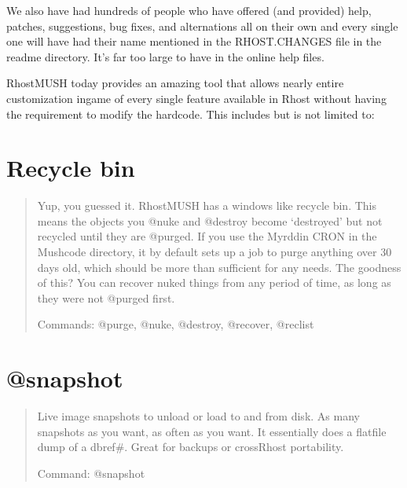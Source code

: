 \documentclass[letterpaper,10pt,english]{sphinxmanual}
\begin{document}
\sphinxAtStartPar
We also have had hundreds of people who have offered (and provided) help,
patches, suggestions, bug fixes, and alternations all on their own and
every single one will have had their name mentioned in the RHOST.CHANGES
file in the readme directory.  It’s far too large to have in the online
help files.

\sphinxAtStartPar
RhostMUSH today provides an amazing tool that allows nearly entire
customization in\sphinxhyphen{}game of every single feature available in Rhost without
having the requirement to modify the hardcode.  This includes but is
not limited to:


\section{Recycle bin}
\label{\detokenize{features:recycle-bin}}\begin{quote}

\sphinxAtStartPar
Yup, you guessed it.  RhostMUSH has a windows like recycle bin.
This means the objects you @nuke and @destroy become ‘destroyed’
but not recycled until they are @purged.  If you use the Myrddin
CRON in the Mushcode directory, it by default sets up a job
to purge anything over 30 days old, which should be more than
sufficient for any needs.  The goodness of this?  You can recover
nuked things from any period of time, as long as they were not
@purged first.

\sphinxAtStartPar
Commands: @purge, @nuke, @destroy, @recover, @reclist
\end{quote}


\section{@snapshot}
\label{\detokenize{features:snapshot}}\begin{quote}

\sphinxAtStartPar
Live image snapshots to unload or load to and from
disk.  As many snapshots as you want, as often as you want.
It essentially does a flatfile dump of a dbref\#.  Great for
backups or cross\sphinxhyphen{}Rhost portability.

\sphinxAtStartPar
Command: @snapshot
\end{quote}
\end{document}
